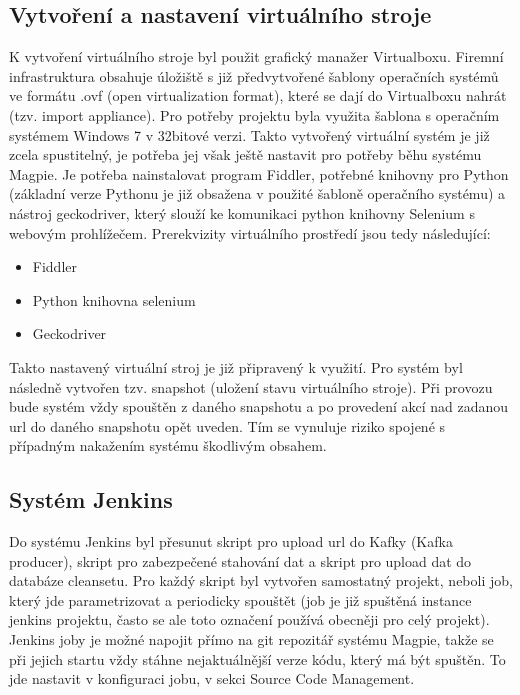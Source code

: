 \documentclass[thesis=M,czech,hidelinks]{FITthesis}[2013/05/06]
\begin{document}
\subsection{Vytvoření a nastavení virtuálního stroje} \label{sec:virtualka}
K vytvoření virtuálního stroje byl použit grafický manažer Virtualboxu. Firemní infrastruktura obsahuje úložiště s již předvytvořené šablony operačních systémů ve formátu .ovf (open virtualization format), které se dají do Virtualboxu nahrát (tzv. import appliance). Pro potřeby projektu byla využita šablona s operačním systémem Windows 7 v 32bitové verzi. Takto vytvořený virtuální systém je již zcela spustitelný, je potřeba jej však ještě nastavit pro potřeby běhu systému Magpie. Je potřeba nainstalovat program Fiddler, potřebné knihovny pro Python (základní verze Pythonu je již obsažena v použité šabloně operačního systému) a nástroj geckodriver, který slouží ke komunikaci python knihovny Selenium s webovým prohlížečem. Prerekvizity virtuálního prostředí jsou tedy následující:
\begin{itemize}
	\item Fiddler
	\item Python knihovna selenium
	\item Geckodriver
\end{itemize}
Takto nastavený virtuální stroj je již připravený k využití. Pro systém byl následně vytvořen tzv. snapshot (uložení stavu virtuálního stroje). Při provozu bude systém vždy spouštěn z daného snapshotu a po provedení akcí nad zadanou url do daného snapshotu opět uveden. Tím se vynuluje riziko spojené s případným nakažením systému škodlivým obsahem.




\subsection{Systém Jenkins} \label{sec:jenk}
Do systému Jenkins byl přesunut skript pro upload url do Kafky (Kafka producer), skript pro zabezpečené stahování dat a skript pro upload dat do databáze cleansetu. Pro každý skript byl vytvořen samostatný projekt, neboli job, který jde parametrizovat a periodicky spouštět (job je již spuštěná instance jenkins projektu, často se ale toto označení používá obecněji pro celý projekt). Jenkins joby je možné napojit přímo na git repozitář systému Magpie, takže se při jejich startu vždy stáhne nejaktuálnější verze kódu, který má být spuštěn. To jde nastavit v konfiguraci jobu, v sekci Source Code Management.
\end{document}
